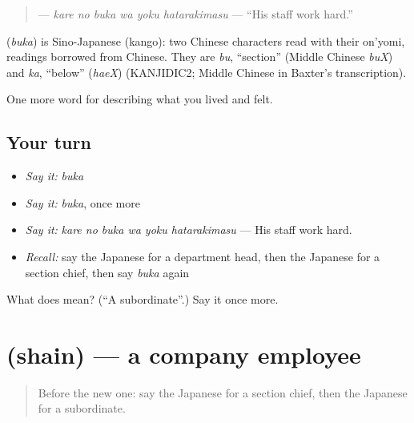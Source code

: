 \begin{quote}
\textbf{   } — \emph{kare no buka wa yoku hatarakimasu} — \textquotedblleft{}His staff work hard.\textquotedblright{}
\end{quote}

\begin{cousinweb}
\textbf{} (\emph{buka}) is Sino-Japanese (kango): two Chinese characters read with their on'yomi, readings borrowed from Chinese. They are \emph{bu}, \textquotedblleft{}section\textquotedblright{} (Middle Chinese \emph{buX}) and \emph{ka}, \textquotedblleft{}below\textquotedblright{} (\emph{haeX}) (KANJIDIC2; Middle Chinese in Baxter's transcription).
\end{cousinweb}

\begin{grammarlens}[title={What you've built}]
One more word for describing what you lived and felt.
\end{grammarlens}

\subsection*{Your turn}
\begin{itemize}
\raggedright
  \item \emph{Say it:} \emph{buka}
  \item \emph{Say it:} \emph{buka}, once more
  \item \emph{Say it:} \emph{kare no buka wa yoku hatarakimasu} — His staff work hard.
  \item \emph{Recall:} say the Japanese for a department head, then the Japanese for a section chief, then say \emph{buka} again
\end{itemize}

\begin{tcolorbox}[breakable,colback=teal!4,colframe=teal!35!black,title={Before you move on}]
What does  mean? (\textquotedblleft{}A subordinate\textquotedblright{}.) Say it once more.
\end{tcolorbox}
\section[\texorpdfstring{\ja{しゃいん} (shain)}{しゃいん (shain)}]{ (shain) — a company employee}

\label{lesson:JA-C452-shain}



\begin{quote}
Before the new one: say the Japanese for a section chief, then the Japanese for a subordinate.
\end{quote}

